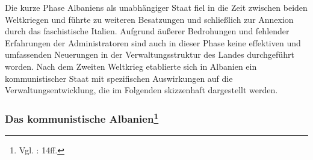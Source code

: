 Die kurze Phase Albaniens als unabhängiger Staat fiel in die Zeit zwischen beiden Weltkriegen und führte zu weiteren Besatzungen und schließlich zur Annexion durch das faschistische Italien. Aufgrund äußerer Bedrohungen und fehlender Erfahrungen der Administratoren sind auch in dieser Phase keine effektiven und umfassenden Neuerungen in der Verwaltungsstruktur des Landes durchgeführt worden. Nach dem Zweiten Weltkrieg etablierte sich in Albanien ein kommunistischer Staat mit spezifischen Auswirkungen auf die Verwaltungsentwicklung, die im Folgenden skizzenhaft dargestellt werden.
\subsubsection[Das kommunistische Albanien]{Das kommunistische Albanien\footnote{Vgl. \cite{vollmer07}: 14ff.}}


